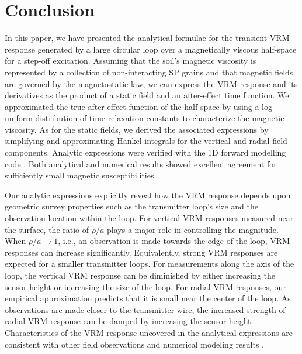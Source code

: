 \documentclass[onecolumn]{IEEEtran} %
\begin{document}

\section{Conclusion}
In this paper, we have presented the analytical formulae for the transient VRM response generated by a large circular loop over a magnetically viscous half-space for a step-off excitation. Assuming that the soil's magnetic viscosity is represented by a collection of non-interacting SP grains \cite{Neel1949} and that magnetic fields are governed by the magnetostatic law, we can express the VRM response and its derivatives as the product of a static field and an after-effect time function. We approximated the true after-effect function of the half-space by using a log-uniform distribution of time-relaxation constants to characterize the magnetic viscosity. As for the static fields, we derived the associated expressions by simplifying and approximating Hankel integrals for the vertical and radial field components. Analytic expressions were verified with the 1D forward modelling code \cite{EM1DTM}. Both analytical and numerical results showed excellent agreement for sufficiently small magnetic susceptibilities.

Our analytic expressions explicitly reveal how the VRM response depends upon geometric survey properties such as the transmitter loop's size and the observation location within the loop. For vertical VRM responses measured near the surface, the ratio of $\rho/a$ plays a major role in controlling the magnitude. When $\rho/a \rightarrow 1$, i.e., an observation is made towards the edge of the loop, VRM responses can increase significantly. Equivalently, strong VRM responses are expected for a smaller transmitter loops. For measurements along the axis of the loop, the vertical VRM response  can be diminished by either increasing the sensor height or increasing the size of the loop. For radial VRM responses, our empirical approximation predicts that it is small near the center of the loop. As observations are made closer to the transmitter wire, the increased strength of radial VRM response can be damped by increasing the sensor height. Characteristics of the VRM response uncovered in the analytical expressions are consistent with other field observations and numerical modeling results \cite{Buselli1982, Barsukov2001, Billings2003, Kozhevnikov2007,Pasion2007, Zadorozhnaya2012}.
\end{document}
